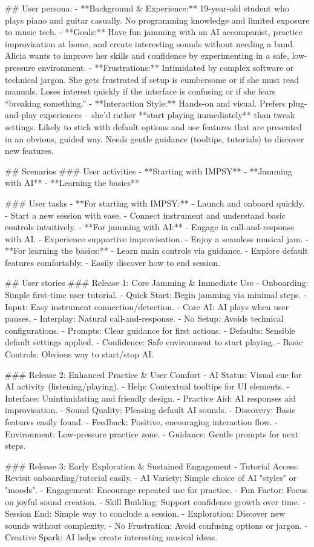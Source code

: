 ## User persona:
- **Background & Experience:** 19-year-old student who plays piano and guitar casually. No programming knowledge and limited exposure to music tech.
- **Goals:** Have fun jamming with an AI accompanist, practice improvisation at home, and create interesting sounds without needing a band. Alicia wants to improve her skills and confidence by experimenting in a safe, low-pressure environment.
- **Frustrations:** Intimidated by complex software or technical jargon. She gets frustrated if setup is cumbersome or if she must read manuals. Loses interest quickly if the interface is confusing or if she fears “breaking something.”
- **Interaction Style:** Hands-on and visual. Prefers plug-and-play experiences – she’d rather **start playing immediately** than tweak settings. Likely to stick with default options and use features that are presented in an obvious, guided way. Needs gentle guidance (tooltips, tutorials) to discover new features.

## Scenarios
###  User activities
- **Starting with IMPSY**
- **Jamming with AI**
- **Learning the basics**

###  User tasks
- **For starting with IMPSY:**
    -   Launch and onboard quickly.
    -   Start a new session with ease.
    -   Connect instrument and understand basic controls intuitively.
- **For jamming with AI:**
    -   Engage in call-and-response with AI.
    -   Experience supportive improvisation.
    -   Enjoy a seamless musical jam.
- **For learning the basics:**
    -   Learn main controls via guidance.
    -   Explore default features comfortably.
    -   Easily discover how to end session.

## User stories
###  Release 1: Core Jamming & Immediate Use
- Onboarding: Simple first-time user tutorial.
- Quick Start: Begin jamming via minimal steps.
- Input: Easy instrument connection/detection.
- Core AI: AI plays when user pauses.
- Interplay: Natural call-and-response.
- No Setup: Avoids technical configurations.
- Prompts: Clear guidance for first actions.
- Defaults: Sensible default settings applied.
- Confidence: Safe environment to start playing.
- Basic Controls: Obvious way to start/stop AI.

###  Release 2: Enhanced Practice & User Comfort
- AI Status: Visual cue for AI activity (listening/playing).
- Help: Contextual tooltips for UI elements.
- Interface: Unintimidating and friendly design.
- Practice Aid: AI responses aid improvisation.
- Sound Quality: Pleasing default AI sounds.
- Discovery: Basic features easily found.
- Feedback: Positive, encouraging interaction flow.
- Environment: Low-pressure practice zone.
- Guidance: Gentle prompts for next steps.

###  Release 3: Early Exploration & Sustained Engagement
- Tutorial Access: Revisit onboarding/tutorial easily.
- AI Variety: Simple choice of AI "styles" or "moods".
- Engagement: Encourage repeated use for practice.
- Fun Factor: Focus on joyful sound creation.
- Skill Building: Support confidence growth over time.
- Session End: Simple way to conclude a session.
- Exploration: Discover new sounds without complexity.
- No Frustration: Avoid confusing options or jargon.
- Creative Spark: AI helps create interesting musical ideas. 